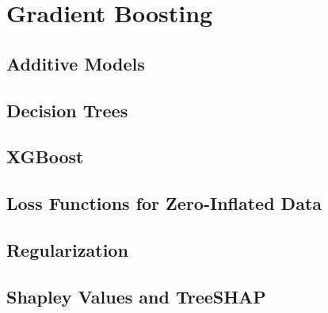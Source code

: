 \chapter{Gradient Boosting}
\label{ch:boosting}

\section{Additive Models}

\section{Decision Trees}

\section{XGBoost}

\section{Loss Functions for Zero-Inflated Data}

\section{Regularization}

\section{Shapley Values and TreeSHAP}

